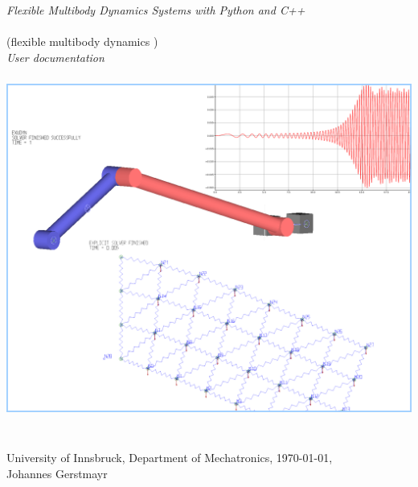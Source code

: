 \documentclass[11pt,a4paper]{book} %
\begin{document}
\setcounter{page}{0}
\pagestyle{empty}

\begin{center}
{\Large {\it Flexible Multibody Dynamics Systems with Python and C++}}\vspace{1cm}\\
{\Huge {\bf \codeName}} \vspace{0.5cm}\\
{\small (flexible multibody dynamics )} \vspace{1cm}\\
{\Large \it User documentation} \vspace{1cm}\\
\vspace{1cm}
\includegraphics[height=12cm]{intro1.png}\\
\vspace{0.5cm}
{\tiny }\\
\vspace{1.5cm}
University of Innsbruck, Department of Mechatronics, \today,\vspace{0.25cm}\\
Johannes Gerstmayr\vspace{2cm}
\end{center}
\end{document}
